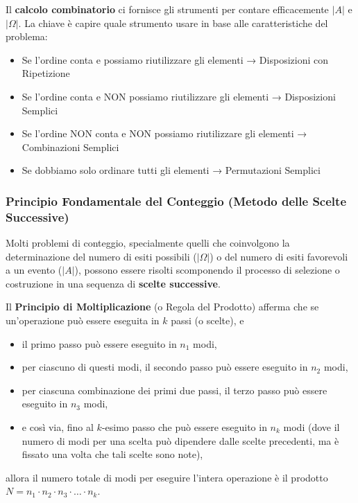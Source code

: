 Il \textbf{calcolo combinatorio} ci fornisce gli strumenti per contare efficacemente $|A|$ e $|\Omega|$. La chiave è capire quale strumento usare in base alle caratteristiche del problema:
\begin{itemize}
    \item Se l'ordine conta e possiamo riutilizzare gli elementi → Disposizioni con Ripetizione
    \item Se l'ordine conta e NON possiamo riutilizzare gli elementi → Disposizioni Semplici
    \item Se l'ordine NON conta e NON possiamo riutilizzare gli elementi → Combinazioni Semplici
    \item Se dobbiamo solo ordinare tutti gli elementi → Permutazioni Semplici
\end{itemize}

\subsubsection{Principio Fondamentale del Conteggio (Metodo delle Scelte Successive)}
\label{subsubsec:principio_moltiplicazione}

Molti problemi di conteggio, specialmente quelli che coinvolgono la determinazione del numero di esiti possibili ($|\Omega|$) o del numero di esiti favorevoli a un evento ($|A|$), possono essere risolti scomponendo il processo di selezione o costruzione in una sequenza di \textbf{scelte successive}.

\noindent Il \textbf{Principio di Moltiplicazione} (o Regola del Prodotto) afferma che se un'operazione può essere eseguita in $k$ passi (o scelte), e
\begin{itemize}
    \item il primo passo può essere eseguito in $n_1$ modi,
    \item per ciascuno di questi modi, il secondo passo può essere eseguito in $n_2$ modi,
    \item per ciascuna combinazione dei primi due passi, il terzo passo può essere eseguito in $n_3$ modi,
    \item e così via, fino al $k$-esimo passo che può essere eseguito in $n_k$ modi (dove il numero di modi per una scelta può dipendere dalle scelte precedenti, ma è fissato una volta che tali scelte sono note),
\end{itemize}
allora il numero totale di modi per eseguire l'intera operazione è il prodotto $N = n_1 \cdot n_2 \cdot n_3 \cdot \dots \cdot n_k$.

